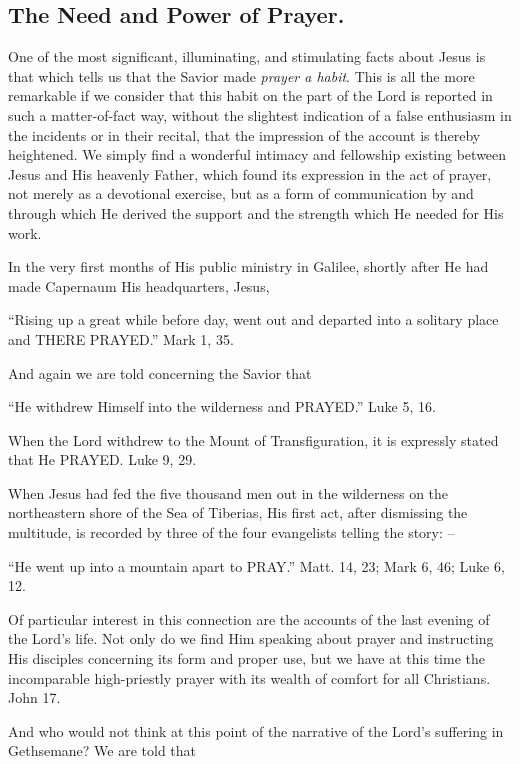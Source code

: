 \documentclass[
]{book}
\begin{document}
\hypertarget{the-need-and-power-of-prayer.}{%
\subsection*{The Need and Power of Prayer.}\label{the-need-and-power-of-prayer.}}

One of the most significant, illuminating, and stimulating facts about Jesus is that which tells us that the Savior made \emph{prayer a habit}. This is all the more remarkable if we consider that this habit on the part of the Lord is reported in such a matter-of-fact way, without the slightest indication of a false enthusiasm in the incidents or in their recital, that the impression of the account is thereby heightened. We simply find a wonderful intimacy and fellowship existing between Jesus and His heavenly Father, which found its expression in the act of prayer, not merely as a devotional exercise, but as a form of communication by and through which He derived the support and the strength which He needed for His work.

In the very first months of His public ministry in Galilee, shortly after He had made Capernaum His headquarters, Jesus,

``Rising up a great while before day, went out and departed into a solitary place and THERE PRAYED.'' Mark 1, 35.

And again we are told concerning the Savior that

``He withdrew Himself into the wilderness and PRAYED.'' Luke 5, 16.

When the Lord withdrew to the Mount of Transfiguration, it is expressly stated that He PRAYED. Luke 9, 29.

When Jesus had fed the five thousand men out in the wilderness on the northeastern shore of the Sea of Tiberias, His first act, after dismissing the multitude, is recorded by three of the four evangelists telling the story: --

``He went up into a mountain apart to PRAY.'' Matt. 14, 23; Mark 6, 46; Luke 6, 12.

Of particular interest in this connection are the accounts of the last evening of the Lord's life. Not only do we find Him speaking about prayer and instructing His disciples concerning its form and proper use, but we have at this time the incomparable high-priestly prayer with its wealth of comfort for all Christians. John 17.

And who would not think at this point of the narrative of the Lord's suffering in Gethsemane? We are told that
\end{document}
